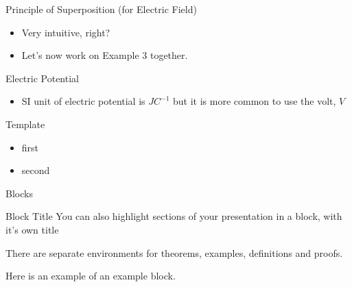 \documentclass{beamer}
\begin{document}
\begin{frame}{Principle of Superposition (for Electric Field)}{}
  \begin{itemize}
\begin{block}{Principle of Superposition (for Electric Field)}
The resultant electric field \(E\) at a point \(P\) in an electric field is the vector sum of the fields at \(P\) due to each point charge in the system.
\end{block}
  \item Very intuitive, right?
  \item Let's now work on Example 3 together.
  \end{itemize}
\end{frame}

\begin{frame}{Electric Potential}{}
  \begin{itemize}
\begin{block}{Definition of Electric Potential}
The electric potential V, at a point in an electric field, is defined as the work done per unit positive charge, by an external force, in moving a small test charge from infinity to that point in the electric field.
\[V=\frac{W}{q}\]
\end{block}
  \item SI unit of electric potential is \(JC^{-1}\) but it is more common to use the volt, \(V\)
  \end{itemize}
\end{frame}


\begin{frame}{Template}{}
  \begin{itemize}
  \item first
  \item second
  \end{itemize}
\end{frame}


\begin{frame}{Blocks}
\begin{block}{Block Title}
You can also highlight sections of your presentation in a block, with it's own title
\end{block}
\begin{theorem}
There are separate environments for theorems, examples, definitions and proofs.
\end{theorem}
\begin{example}
Here is an example of an example block.
\end{example}
\end{frame}
\end{document}
